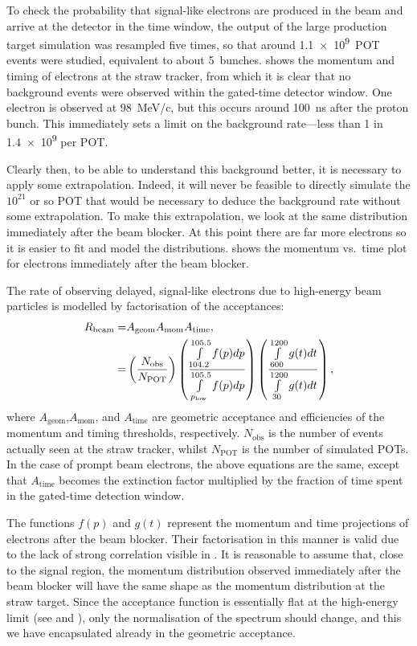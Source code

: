 To check the probability that signal-like electrons are produced in the beam and arrive at the detector in the time window,
the output of the large production target simulation was resampled five times, so that around \num{1.1e9}~\ac{POT} events were studied, equivalent to about 5~\phaseII bunches.
 shows the momentum and timing of electrons at the straw tracker, from which it is clear that no background events were observed within the gated-time detector window.
One electron is observed at 98~MeV/c, but this occurs around 100~ns after the proton bunch.
This immediately sets a limit on the background rate---less than 1 in \num{1.4e9} per POT.
\FigBgBeamMomVsTime

Clearly then, to be able to understand this background better, it is necessary to apply some extrapolation.
Indeed, it will never be feasible to directly simulate the $10^{21}$ or so POT that would be necessary to deduce the background rate without some extrapolation.
To make this extrapolation, we look at the same distribution immediately after the beam blocker.  
At this point there are far more electrons so it is easier to fit and model the distributions.
 shows the momentum vs.\ time plot for electrons immediately after the beam blocker.

The rate of observing delayed, signal-like electrons due to high-energy beam particles is modelled by factorisation of the acceptances:
\begin{align}
R_\mathrm{beam}=&A_\textrm{geom}A_\textrm{mom}A_\textrm{time},\\
=&\left(\frac{N_\textrm{obs}}{N_\textrm{POT}}\right)\left(\frac{\int\limits_{104.2}^{105.5}f(p)dp}{\int\limits_{p_\textrm{low}}^{105.5}f(p)dp}\right)\left(\frac{\int\limits_{600}^{1200}g(t)dt}{\int\limits_{30}^{1200}g(t)dt}\right),
\eqlabel{bg:beam:factors}
\end{align}
where $A_\textrm{geom}$,$A_\textrm{mom}$, and $A_\textrm{time}$ are geometric acceptance and efficiencies of the momentum and timing thresholds, respectively.
$N_\textrm{obs}$ is the number of events actually seen at the straw tracker, whilst $N_\textrm{POT}$ is the number of simulated \acp{POT}.
In the case of prompt beam electrons, the above equations are the same, except that $A_\textrm{time}$ becomes the extinction factor multiplied by the fraction of time spent in the gated-time detection window.
\FigBgBeamExtrapolate

The functions $f(p)$ and $g(t)$ represent the momentum and time projections of electrons after the beam blocker. 
Their factorisation in this manner is valid due to the lack of strong correlation visible in .
It is reasonable to assume that, close to the signal region, the momentum distribution observed immediately after the beam blocker will have the same shape as the momentum distribution at the straw target.
Since the acceptance function is essentially flat at the high-energy limit (see  and ), only the normalisation of the spectrum should change, and this we have encapsulated already in the geometric acceptance.

